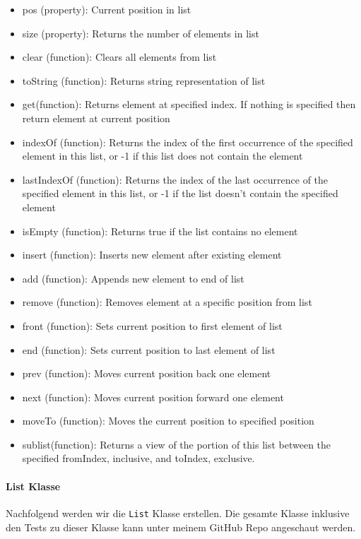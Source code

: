 \documentclass{book}
\begin{document}
\begin{itemize} 
	\item pos (property): Current position in list
	\item size (property): Returns the number of elements in list	
	\item clear (function): Clears all elements from list
	\item toString (function): Returns string representation of list
	\item get(function): Returns element at specified index. If nothing is specified then return element at current position
	\item indexOf (function): Returns the index of the first occurrence of the specified element in this list, or -1 if this list does not contain the element
	\item lastIndexOf (function): Returns the index of the last occurrence of the specified element in this list, or -1 if the list doesn't contain the specified element 
	\item isEmpty (function): Returns true if the list contains no element
	\item insert (function): Inserts new element after existing element
	\item add (function): Appends new element to end of list
	\item remove (function): Removes element at a specific position from list
	\item front (function): Sets current position to first element of list
	\item end (function): Sets current position to last element of list
	\item prev (function): Moves current position back one element
	\item next (function): Moves current position forward one element
	\item moveTo (function): Moves the current position to specified position	
	\item sublist(function): Returns a view of the portion of this list between the specified fromIndex, inclusive, and toIndex, exclusive. 
\end{itemize}

\paragraph{List Klasse}
Nachfolgend werden wir die \lstinline|List| Klasse erstellen. Die gesamte Klasse inklusive den Tests zu dieser Klasse kann unter meinem GitHub Repo angeschaut werden.
\end{document}
